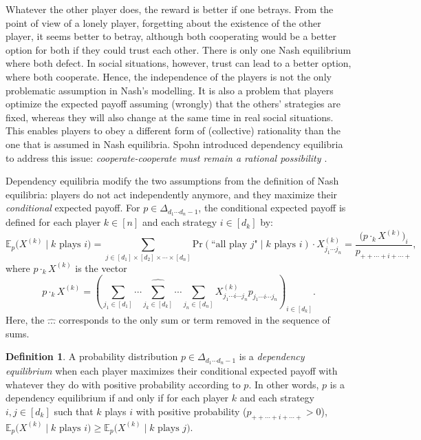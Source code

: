 \documentclass[11pt]{amsart}
\numberwithin{equation}{section}
\theoremstyle{plain}
\numberwithin{theorem}{section}
\theoremstyle{definition}
\newtheorem{definition}[theorem]{Definition}
\begin{document}
Whatever the other player does, the reward is better if one betrays. From the point of view of a lonely player, forgetting about the existence of the other player, it seems better to betray, although both cooperating would be a better option for both if they could trust each other. There is only one Nash equilibrium where both defect. In social situations, however, trust can lead to a better option, where both cooperate. Hence, the independence of the players is not the only problematic assumption in Nash's modelling. It is also a problem that players optimize the expected payoff assuming (wrongly) that the others' strategies are fixed, whereas they will also change at the same time in real social situations. This enables players to obey a different form of (collective) rationality than the one that is assumed in Nash equilibria. Spohn introduced dependency equilibria to address this issue: \emph{cooperate-cooperate must remain a rational possibility \cite{spohn2003dependency}}.

Dependency equilibria modify the two assumptions from the definition of Nash equilibria:
players do not act independently anymore, and they maximize their \textit{conditional} expected payoff. For $p \in \Delta_{d_1 \cdots d_n -1}$, the conditional expected payoff is defined for each player $k\in[n]$ and each strategy $i\in[d_k]$ by:
\[
\mathbb E_p\big(X^{(k)}\mid  k\text{ plays }i\big)=\sum_{j\in[d_1]\times[d_2]\times\cdots\times[d_n]}\text{Pr}(\text{``all play }j\text{"}\mid k\text{ plays }i)\cdot X^{(k)}_{j_1\cdots j_n}=\frac{\big(p\cdot_k X^{(k)}\big)_i}{p_{++\cdots+i+\cdots+}},
\]
where $ p\cdot_kX^{(k)}$ is the vector
\[
\displaystyle p\cdot_kX^{(k)}=\left(   \sum_{j_1\in [d_1]}\cdots \widehat{\sum_{j_k\in[d_k]}}\cdots \sum_{j_n\in [d_n]}  X^{(k)}_{j_1\cdots i\cdots j_n}p_{j_1\cdots i\cdots j_n} \right)_{i\in[d_k]}.
\]
Here, the $\widehat{ ... }$ corresponds to the only sum or term removed in the sequence of sums.

\begin{definition}\label{Definition $1.17$}
A probability distribution $p\in \Delta_{d_1 \cdots d_n -1}$ is a \textit{dependency equilibrium} when each player maximizes their conditional expected payoff with whatever they do with positive probability according to $p$. In other words, $p$ is a dependency equilibrium if and only if for each player $k$ and each strategy $i,j\in[d_k]$ such that $k$ plays $i$ with positive probability ($p_{++\cdots+i+\cdots+}>0$), $\mathbb E_p\big(X^{(k)}\mid k\text{ plays }i\big)\ge\mathbb E_p\big(X^{(k)}\mid k\text{ plays }j\big)$.
\end{definition}
\end{document}

